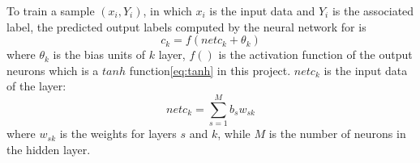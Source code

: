 To train a sample $(x_{i}, Y_{i})$, in which $x_{i}$ is the input data and $Y_{i}$ is the associated label, the predicted output labels computed by the neural network for is
\begin{equation}\label{eq:MultiLabelActivation}
c_{k} = f(netc_{k} + \theta_{k})
\end{equation}
where $\theta_{k}$ is the bias units of $k$ layer, $f()$ is the activation function of the output neurons which is a $tanh$ function\ref{eq:tanh} in this project. $netc_{k}$ is the input data of the layer:
\begin{equation}\label{eq:MultiLabel}
netc_{k} = \sum_{s=1}^M b_{s}w_{sk}
\end{equation}
where $w_{sk}$ is the weights for layers $s$ and $k$, while $M$ is the number of neurons in the hidden layer.


